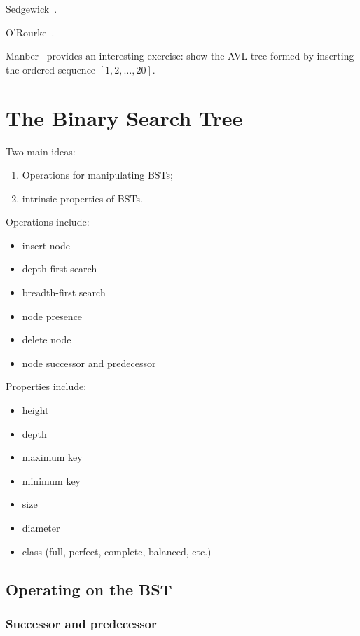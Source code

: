 \documentclass{article}
\begin{document}
Sedgewick~\cite{sedgewick:r1990}.

O'Rourke~\cite{orourke:j1998}.

Manber~\cite[p. 87, Ex. 4.8]{manber:u1989} provides an interesting exercise:
show the AVL tree formed by inserting the ordered sequence $[1, 2, \ldots, 20]$.

\section{The Binary Search Tree}

Two main ideas:

\begin{enumerate}
\item Operations for manipulating BSTs;
\item intrinsic properties of BSTs.
\end{enumerate}

Operations include:

\begin{itemize}
\item insert node
\item depth-first search
\item breadth-first search
\item node presence
\item delete node
\item node successor and predecessor
\end{itemize}

Properties include:

\begin{itemize}
\item height
\item depth
\item maximum key
\item minimum key
\item size
\item diameter
\item class (full, perfect, complete, balanced, etc.)
\end{itemize}


\subsection{Operating on the BST}


\subsubsection{Successor and predecessor}
\end{document}
